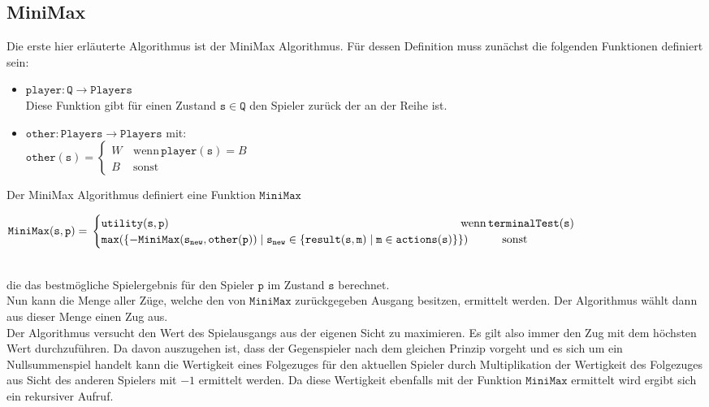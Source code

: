 \subsection{MiniMax}
Die erste hier erläuterte Algorithmus ist der MiniMax Algorithmus. Für dessen Definition muss zunächst die folgenden Funktionen definiert sein:
\begin{itemize}
\item $\mathtt{player}: \mathtt{Q} \rightarrow \mathtt{Players}$
\\Diese Funktion gibt für einen Zustand $\mathtt{s} \in \mathtt{Q}$ den Spieler zurück der an der Reihe ist.
\item $\mathtt{other}: \mathtt{Players} \rightarrow \mathtt{Players}$ mit:
\\$\mathtt{other}(\mathtt{s}) = \begin{cases}
W & \, \text{wenn} \, \mathtt{player}(\mathtt{s}) = B \\
B & \, \text{sonst}
\end{cases}$
\end{itemize}
Der MiniMax Algorithmus definiert eine Funktion $\mathtt{MiniMax}$
\\\begin{footnotesize}$\mathtt{MiniMax}(\mathtt{s}, \mathtt{p}) = \\ \begin{cases}
\mathtt{utility}(\mathtt{s}, \mathtt{p}) \hspace{9cm} \, \text{wenn} \, \mathtt{terminalTest}(\mathtt{s})\\
\mathtt{max}(\{-\mathtt{MiniMax}(\mathtt{s}_{\mathtt{new}}, \mathtt{other}(\mathtt{p})) \mid \mathtt{s}_{\mathtt{new}} \in \{\mathtt{result}(\mathtt{s}, \mathtt{m}) \mid \mathtt{m} \in \mathtt{actions}(\mathtt{s})\}\})  \, \hspace{1cm} \text{sonst}
\end{cases}$
\end{footnotesize}
\vspace{0.5cm}
\\die das bestmögliche Spielergebnis für den Spieler $\mathtt{p}$ im Zustand $\mathtt{s}$ berechnet.
\\Nun kann die  Menge aller Züge, welche den von $\mathtt{MiniMax}$ zurückgegeben Ausgang besitzen, ermittelt werden. Der Algorithmus wählt dann aus dieser Menge einen Zug aus.
\\Der Algorithmus versucht den Wert des Spielausgangs aus der eigenen Sicht zu maximieren. Es gilt also immer den Zug mit dem höchsten Wert durchzuführen. Da davon auszugehen ist, dass der Gegenspieler nach dem gleichen Prinzip vorgeht und es sich um ein Nullsummenspiel handelt kann die Wertigkeit eines Folgezuges für den aktuellen Spieler durch Multiplikation der Wertigkeit des Folgezuges aus Sicht des anderen Spielers mit $-1$ ermittelt werden. Da diese Wertigkeit ebenfalls mit der Funktion $\mathtt{MiniMax}$ ermittelt wird ergibt sich ein rekursiver Aufruf.
